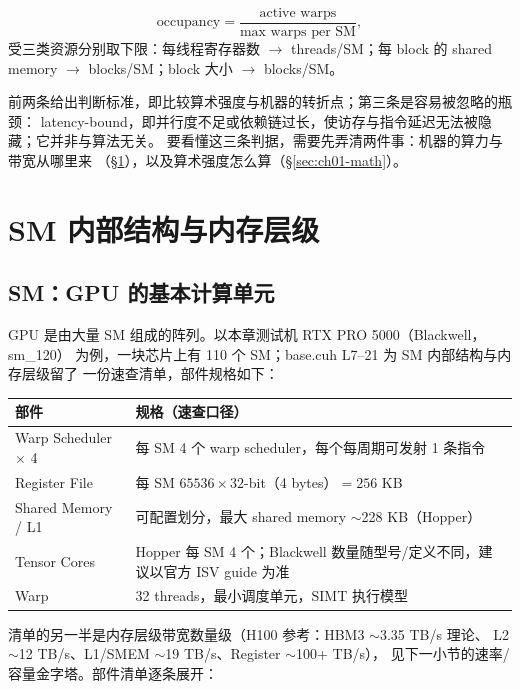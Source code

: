 \begin{equation*}
  \mathrm{occupancy} = \frac{\text{active\ warps}}{\text{max\ warps\ per\ SM}},
\end{equation*}
受三类资源分别取下限：每线程寄存器数 $\to$ threads/SM；每 block 的
shared memory $\to$ blocks/SM；block 大小 $\to$ blocks/SM。

前两条给出判断标准，即比较算术强度与机器的转折点；第三条是容易被忽略的瓶颈：
latency-bound，即并行度不足或依赖链过长，使访存与指令延迟无法被隐藏；它并非与算法无关。
要看懂这三条判据，需要先弄清两件事：机器的算力与带宽从哪里来
（\S\ref{sec:ch01-sm}），以及算术强度怎么算（\S\ref{sec:ch01-math}）。

\section{SM 内部结构与内存层级}\label{sec:ch01-sm}

\subsection{SM：GPU 的基本计算单元}

GPU 是由大量 SM 组成的阵列。以本章测试机 RTX PRO 5000（Blackwell，sm\_120）
为例，一块芯片上有 110 个 SM；base.cuh L7--21 为 SM 内部结构与内存层级留了
一份速查清单，部件规格如下：

\begin{center}
\begin{tabular}{lp{10.6cm}}
\toprule
部件 & 规格（速查口径） \\
\midrule
Warp Scheduler $\times$ 4 & 每 SM 4 个 warp scheduler，每个每周期可发射 1 条指令 \\
Register File & 每 SM $65536 \times 32$-bit（4 bytes）$= 256$ KB \\
Shared Memory / L1 & 可配置划分，最大 shared memory $\sim$228 KB（Hopper） \\
Tensor Cores & Hopper 每 SM 4 个；Blackwell 数量随型号/定义不同，建议以官方 ISV guide 为准 \\
Warp & 32 threads，最小调度单元，SIMT 执行模型 \\
\bottomrule
\end{tabular}
\end{center}

清单的另一半是内存层级带宽数量级（H100 参考：HBM3 $\sim$3.35 TB/s 理论、
L2 $\sim$12 TB/s、L1/SMEM $\sim$19 TB/s、Register $\sim$100+ TB/s），
见下一小节的速率/容量金字塔。部件清单逐条展开：

